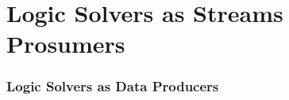 \documentclass[presentation]{beamer}
\begin{document}
\section{Logic Solvers as Streams Prosumers}

\begin{frame}[allowframebreaks]
\frametitle{Logic Solvers as Data \textbf{Producers}}






\end{frame}
\end{document}

